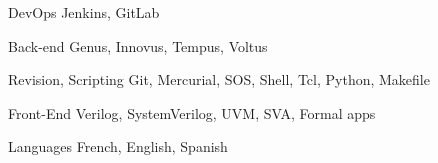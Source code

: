 

\begin{cvskills}

  \cvskill
    {DevOps} %
    {Jenkins, GitLab} %

  \cvskill
    {Back-end} %
    {Genus, Innovus, Tempus, Voltus} %

  \cvskill
    {Revision, Scripting} %
    {Git, Mercurial, SOS, Shell, Tcl, Python, Makefile} %

  \cvskill
    {Front-End} %
    {Verilog, SystemVerilog, UVM, SVA, Formal apps} %

  \cvskill
    {Languages} %
    {French, English, Spanish} %

\end{cvskills}
